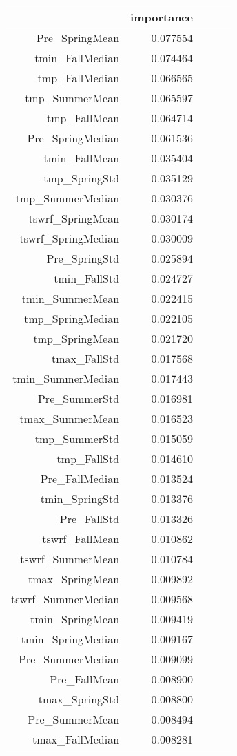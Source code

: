 \begin{tabular}{rrrrr}
\toprule
 & importance \\
\midrule
Pre_SpringMean & 0.077554 \\
tmin_FallMedian & 0.074464 \\
tmp_FallMedian & 0.066565 \\
tmp_SummerMean & 0.065597 \\
tmp_FallMean & 0.064714 \\
Pre_SpringMedian & 0.061536 \\
tmin_FallMean & 0.035404 \\
tmp_SpringStd & 0.035129 \\
tmp_SummerMedian & 0.030376 \\
tswrf_SpringMean & 0.030174 \\
tswrf_SpringMedian & 0.030009 \\
Pre_SpringStd & 0.025894 \\
tmin_FallStd & 0.024727 \\
tmin_SummerMean & 0.022415 \\
tmp_SpringMedian & 0.022105 \\
tmp_SpringMean & 0.021720 \\
tmax_FallStd & 0.017568 \\
tmin_SummerMedian & 0.017443 \\
Pre_SummerStd & 0.016981 \\
tmax_SummerMean & 0.016523 \\
tmp_SummerStd & 0.015059 \\
tmp_FallStd & 0.014610 \\
Pre_FallMedian & 0.013524 \\
tmin_SpringStd & 0.013376 \\
Pre_FallStd & 0.013326 \\
tswrf_FallMean & 0.010862 \\
tswrf_SummerMean & 0.010784 \\
tmax_SpringMean & 0.009892 \\
tswrf_SummerMedian & 0.009568 \\
tmin_SpringMean & 0.009419 \\
tmin_SpringMedian & 0.009167 \\
Pre_SummerMedian & 0.009099 \\
Pre_FallMean & 0.008900 \\
tmax_SpringStd & 0.008800 \\
Pre_SummerMean & 0.008494 \\
tmax_FallMedian & 0.008281 \\

\end{tabular}
